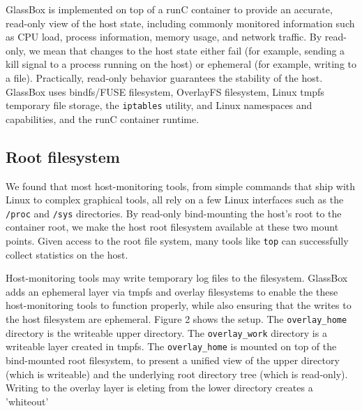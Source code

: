 \documentclass{proc}
\begin{document}
GlassBox is implemented on top of a runC container to provide an accurate, read-only view of the host state, including commonly monitored information such as CPU load, process information, memory usage, and network traffic. By read-only, we mean that changes to the host state either fail (for example, sending a kill signal to a process running on the host) or ephemeral (for example, writing to a file). Practically, read-only behavior guarantees the stability of the host. GlassBox uses bindfs/FUSE filesystem, OverlayFS filesystem, Linux tmpfs temporary file storage, the \texttt{iptables} utility, and Linux namespaces and capabilities, and the runC container runtime.

\subsection*{Root filesystem}
We found that most host-monitoring tools, from simple commands that ship with Linux to complex graphical tools, all rely on a few Linux interfaces such as the \texttt{/proc} and \texttt{/sys} directories. By read-only bind-mounting the host's root to the container root, we make the host root filesystem available at these two mount points. Given access to the root file system, many tools like \texttt{top} can successfully collect statistics on the host. 

Host-monitoring tools may write temporary log files to the filesystem. GlassBox adds an ephemeral layer via tmpfs and overlay filesystems to enable the these host-monitoring tools to function properly, while also ensuring that the writes to the host filesystem are ephemeral. Figure 2 shows the setup. The \texttt{overlay\_home} directory is the writeable upper directory. The \texttt{overlay\_work} directory is a writeable layer created in tmpfs. The \texttt{overlay\_home} is mounted on top of the bind-mounted root filesystem, to present a unified view of the upper directory (which is writeable) and the underlying root directory tree (which is read-only). Writing to the overlay layer is eleting from the lower directory creates a 'whiteout'
\end{document}
